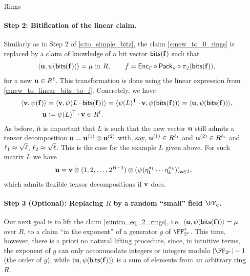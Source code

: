 \begin{lncsmove}{Rings}
\paragraph{Step 2: Bitification of the linear claim.} Similarly as in Step 2 of \cref{s:to_simple_bitz}, the claim \eqref{e:new_to_0_rings} is replaced by a claim of knowledge of a bit vector  $\mathsf{bits}(\mathbf{f})$ such that \begin{equation}\label{e:intro_eq_2_rings}\langle \mathbf{u}, \psi(\mathsf{bits}(\mathbf{f}))\rangle =\mu \ \text{in  } R, \qquad f = \mathsf{Enc}_{\mathcal{C}}\circ \mathsf{Pack}_\nu \circ \pi_2(\mathsf{bits}(\mathbf{f})),
\end{equation} 
for a new $\mathbf{u}\in R^{\ell}$. This transformation is done using the linear expression from \eqref{e:new_to_linear_bits_to_f}. Concretely, we have $$\begin{aligned}\langle \mathbf{v}, \psi(\mathbf{f})\rangle &= \langle \mathbf{v}, \psi( L \cdot \mathsf{bits}(\mathbf{f})) \rangle = \langle \psi(L)^{\mathsf{T}}\cdot \mathbf{v}, \psi(\mathsf{bits}(\mathbf{f})) \rangle = \langle \mathbf{u}, \psi(\mathsf{bits}(\mathbf{f}))\rangle, \\ \mathbf{u}&{\;\vcentcolon=\;} \psi(L)^{\mathsf{T}}\cdot \mathbf{v} \in R^{\ell}.\end{aligned}$$ 
As before, it is important that $L$ is such that the new vector $\mathbf{u}$ still admits a tensor decomposition $\mathbf{u}=\mathbf{u}^{(1)} \otimes \mathbf{u}^{(2)}$ with, say, $\mathbf{u}^{(1)}\in R^{\ell_1}$ and $\mathbf{u}^{(2)}\in R^{\ell_2}$ and $\ell_1\approx \sqrt{\ell}$, $\ell_2\approx \sqrt{\ell}$. This is the case for the example $L$ given above. For such matrix $L$ we have
%
$$\begin{aligned} \mathbf{u}&=\mathbf{v}\otimes (1, 2, \ldots, 2^{B-1})\otimes (\psi(\eta_1^{a_1}\cdots \eta_k^{a_k}))_{\mathbf{a}\in I},\end{aligned}$$ 
%
which admits flexible tensor decompositions if $\mathbf{v}$ does.
%


 \paragraph{Step 3 (Optional):  Replacing $R$ by a random ``small'' field $\FF_q$.}  Our next goal is to lift the claim \eqref{e:intro_eq_2_rings}, i.e.\ $\langle \mathbf{u}, \psi(\mathsf{bits}(\mathbf{f}))\rangle =\mu$ over $R$, to a claim ``in the exponent'' of a generator $g$ of $\comfield^*$. This time, however, there is a priori no natural lifting procedure, since, in intuitive terms, the exponent of $g$ can only accommodate integers or integers modulo $|\comfield|-1$ (the order of $g$), while $\langle \mathbf{u}, \psi(\mathsf{bits}(\mathbf{f}))\rangle$ is a sum of elements from an arbitrary ring $R$.


\end{lncsmove}
